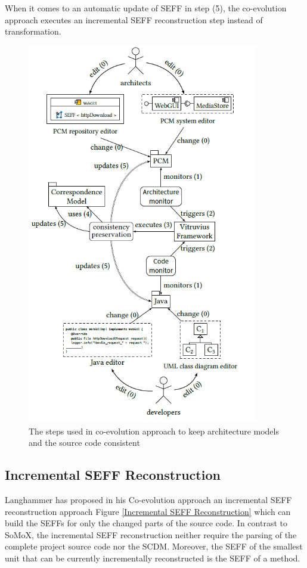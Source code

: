 When it comes to an automatic update of SEFF in step (5), the co-evolution approach executes an incremental SEFF reconstruction step instead of transformation. 


\begin{figure}[h]
\centering
\includegraphics[width=0.9\textwidth]{figures/coevolution_approach}
\caption{The steps used in co-evolution approach to keep architecture models and the source code consistent \cite{langhammer2015co}}
\label{fig:coevoloution approach}
\end{figure}

\subsection{Incremental SEFF Reconstruction}
\label{sec:Incremental SEFF Reconstruction}
Langhammer has proposed in his Co-evolution approach an incremental SEFF reconstruction approach Figure \ref{Incremental SEFF Reconstruction} which can build the SEFFs for only the changed parts of the source code. In contrast to SoMoX, the incremental SEFF reconstruction neither require the parsing of the complete project source code nor the SCDM. Moreover, the SEFF of the smallest unit that can be currently incrementally reconstructed is the SEFF of a method. 

